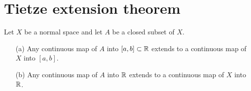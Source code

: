\section{Tietze extension theorem}

\begin{thm}
    Let $X$ be a normal space and let $A$ be a closed subset of $X$.
    \begin{enumerate}
        \item[(a)]
        {
            Any continuous map of $A$ into $[a, b]\subset{\mathbb{R}}$ extends to a continuous map of $X$ into $[a, b]$.
        }
        \item[(b)]
        {
            Any continuous map of $A$ into ${\mathbb{R}}$ extends to a continuous map of $X$ into ${\mathbb{R}}$.
        }
    \end{enumerate}    
\end{thm}
